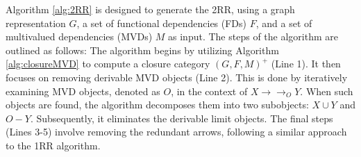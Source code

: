 Algorithm \ref{alg:2RR} is designed to generate the 2RR, using a graph representation $G$, a set of functional dependencies (FDs) $F$, and a set of multivalued dependencies (MVDs) $M$ as input. The steps of the algorithm are outlined as follows: The algorithm begins by utilizing Algorithm \ref{alg:closureMVD} to compute a closure category $(G,F,M)^+$ (Line 1). It then focuses on removing derivable MVD objects (Line 2). This is done by iteratively examining MVD objects, denoted as $O$, in the context of $X \to\to_O Y$. When such objects are found, the algorithm decomposes them into two subobjects: $X \cup Y$ and $O - Y$. Subsequently, it eliminates the derivable limit objects. The final steps (Lines 3-5) involve removing the redundant arrows, following a similar approach to the 1RR algorithm.












